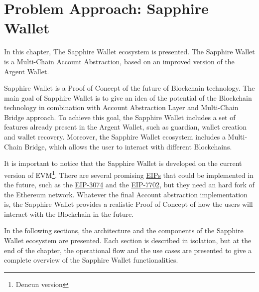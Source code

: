 \chapter{Problem Approach: Sapphire Wallet}
\label{chap:problem_approach}

In this chapter, The Sapphire Wallet ecosystem is presented. The Sapphire Wallet is a Multi-Chain Account Abstraction, based on an improved version of the \hyperref[subsec:argent]{Argent Wallet}.

Sapphire Wallet is a Proof of Concept of the future of Blockchain technology. The main goal of Sapphire Wallet is to give an idea of the potential of the Blockchain technology in combination with Account Abstraction Layer and Multi-Chain Bridge approach. To achieve this goal, the Sapphire Wallet includes a set of features already present in the Argent Wallet, such as guardian, wallet creation and wallet recovery. Moreover, the Sapphire Wallet ecosystem includes a Multi-Chain Bridge, which allows the user to interact with different Blockchains. 

It is important to notice that the Sapphire Wallet is developed on the current version of EVM\footnote{Dencun version}. There are several promising \hyperref[subsec:eips]{EIPs} that could be implemented in the future, such as the \hyperref[subsubsec:eip-3074]{EIP-3074} and the \hyperref[subsubsec:erc-7702]{EIP-7702}, but they need an hard fork of the Ethereum network. Whatever the final Account abstraction implementation is, the Sapphire Wallet provides a realistic Proof of Concept of how the users will interact with the Blockchain in the future.

In the following sections, the architecture and the components of the Sapphire Wallet ecosystem are presented. Each section is described in isolation, but at the end of the chapter, the operational flow and the use cases are presented to give a complete overview of the Sapphire Wallet functionalities.







